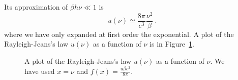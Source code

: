     Its approximation of $\beta h \nu \ll 1$ is 
    \begin{equation}
        u(\nu) \simeq \frac{8 \pi}{c^3} \frac{\nu^2}{\beta} ~.
    \end{equation}
    where we have only expanded at first order the exponential. A plot of the Rayleigh-Jeans's law $u(\nu)$ as a function of $\nu$ is in Figure~\ref{br:rj}.
    \begin{figure}
        \centering
        \caption{A plot of the Rayleigh-Jeans's law $u(\nu)$ as a function of $\nu$. We have used $x = \nu$ and $f(x) = \frac{u \beta c^3}{8 \pi}$.}
        \label{br:rj}
    \end{figure}
